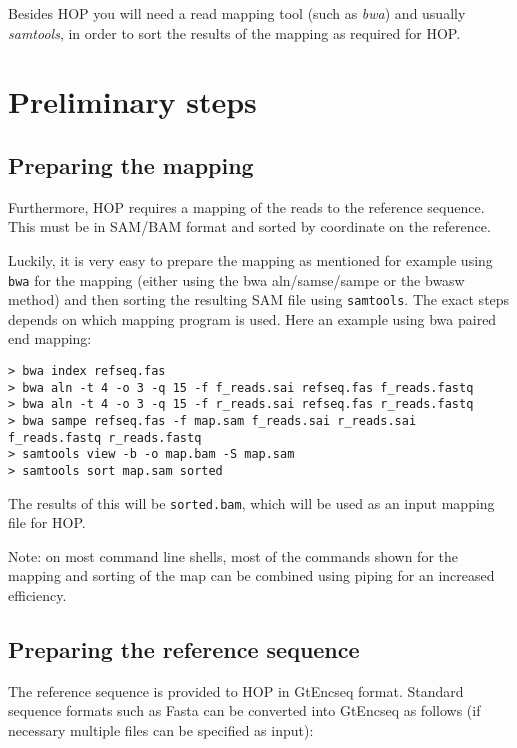 \documentclass[12pt,titlepage]{article}
\newcommand{\Hop}{{HOP}\xspace}
\begin{document}
Besides \Hop you will need a read mapping tool (such as \textit{bwa})
and usually \textit{samtools}, in order to sort the results of the
mapping as required for \Hop.

\section{Preliminary steps}

\subsection{Preparing the mapping}

Furthermore, \Hop requires a mapping of the reads to the reference sequence.
This must be in SAM/BAM format and sorted by coordinate on the reference.

Luckily, it is very easy to prepare the mapping as mentioned for example
using  \texttt{bwa} for the mapping (either using the bwa aln/samse/sampe or
the bwasw method) and then sorting the resulting SAM file
using \texttt{samtools}.
The exact steps depends on which mapping program is used.
Here an example using bwa paired end mapping:

\begin{footnotesize}
\begin{verbatim}
> bwa index refseq.fas
> bwa aln -t 4 -o 3 -q 15 -f f_reads.sai refseq.fas f_reads.fastq
> bwa aln -t 4 -o 3 -q 15 -f r_reads.sai refseq.fas r_reads.fastq
> bwa sampe refseq.fas -f map.sam f_reads.sai r_reads.sai f_reads.fastq r_reads.fastq
> samtools view -b -o map.bam -S map.sam
> samtools sort map.sam sorted
\end{verbatim}
\end{footnotesize}

The results of this will be \texttt{sorted.bam}, which will be used as
an input mapping file for \Hop.

Note: on most command line shells, most of the commands shown for the mapping
and sorting of the map can be combined using piping for an increased efficiency.

\subsection{Preparing the reference sequence}

The reference sequence is provided to \Hop in GtEncseq format.
Standard sequence formats
such as Fasta can be converted into GtEncseq as follows (if necessary multiple files can be
specified as input):
\end{document}
